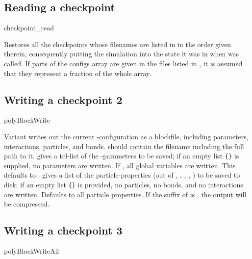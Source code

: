 \subsection{Reading a checkpoint}
\begin{essyntax}
  checkpoint_read 
\end{essyntax}
Restores all the checkpoints whose filenames are listed in
 in the order given therein, consequently putting the
simulation into the state it was in when  was
called. If parts of the configs array are given in the files listed in
, it is assumed that they represent a fraction of the
whole array.

\subsection{Writing a checkpoint 2}
\begin{essyntax}
   polyBlockWrite  
   
\end{essyntax}

Variant  writes out the current \es-configuration as a
blockfile, including parameters, interactions, particles, and bonds.
 should contain the filename including the full path to it.
 gives a tcl-list of the \es-parameters to be saved;
if an empty list \verb!{}! is supplied, no parameters are written.  If
, all global variables are written. This defaults to
.  gives a list of the particle-properties
(out of , , , , ) to be saved
to disk; if an empty list \verb!{}! is provided, no particles, no
bonds, and no interactions are written.  Defaults to all particle
properties.  If the suffix of  is , the output will
be compressed.

\subsection{Writing a checkpoint 3}
\begin{essyntax}
   polyBlockWriteAll  
  
\end{essyntax}

